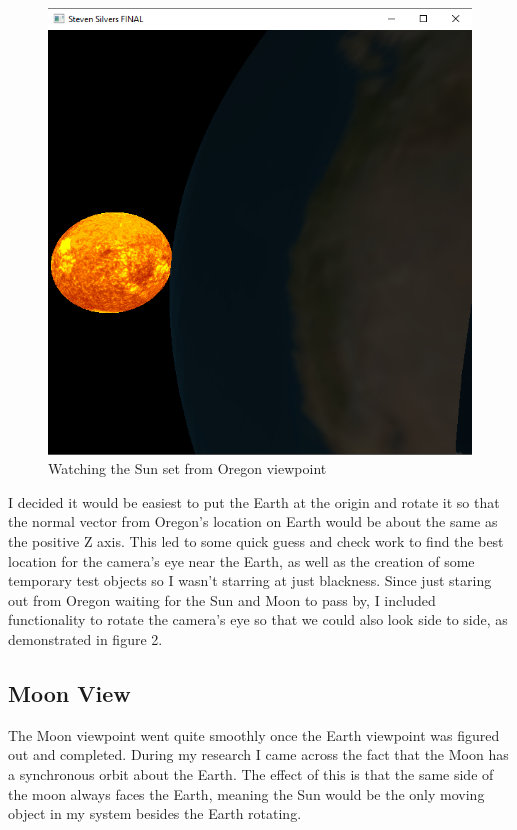\documentclass[12pt,serif,draftclsnofoot,onecolumn]{IEEEtran}
\begin{document}
	\begin{figure}[h]
		\includegraphics[scale=.67]{cap2}
		\caption{Watching the Sun set from Oregon viewpoint}
	\end{figure}

	\par
			I decided it would be easiest to put the Earth at the origin and rotate it so that the normal vector from Oregon's location on Earth would be about the same as the positive Z axis. This led to some quick guess and check work to find the best location for the camera's eye near the Earth, as well as the creation of some temporary test objects so I wasn't starring at just blackness. Since just staring out from Oregon waiting for the Sun and Moon to pass by, I included functionality to rotate the camera's eye so that we could also look side to side, as demonstrated in figure 2.
	\newline
	\subsection{Moon View}
	\par
			The Moon viewpoint went quite smoothly once the Earth viewpoint was figured out and completed. During my research I came across the fact that the Moon has a synchronous orbit about the Earth. The effect of this is that the same side of the moon always faces the Earth, meaning the Sun would be the only moving object in my system besides the Earth rotating.
			
\end{document}
